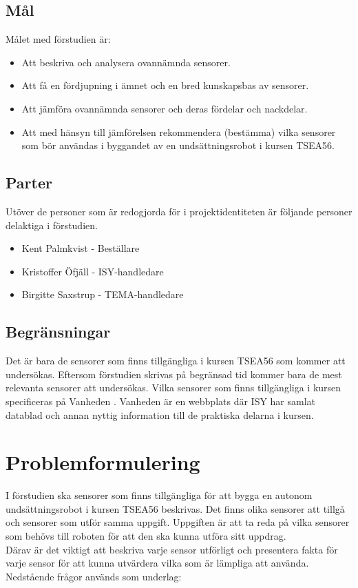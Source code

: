 \documentclass[11pt]{article}
\begin{document}
\begin{flushleft}
\subsection{Mål}
Målet med förstudien är:
\begin{itemize}

\item Att beskriva och analysera ovannämnda sensorer.

\item Att få en fördjupning i ämnet och en bred kunskapsbas av sensorer.

\item Att jämföra ovannämnda sensorer och deras fördelar och nackdelar.

\item Att med hänsyn till jämförelsen rekommendera (bestämma) vilka sensorer som bör användas i byggandet av en undsättningsrobot i kursen TSEA56.

\end{itemize} 


\subsection{Parter}
Utöver de personer som är redogjorda för i projektidentiteten är följande personer delaktiga i förstudien.
\begin{itemize}
\item Kent Palmkvist - Beställare
\item Kristoffer Öfjäll - ISY-handledare
\item Birgitte Saxstrup - TEMA-handledare
\end{itemize}

\subsection{Begränsningar}
Det är bara de sensorer som finns tillgängliga i kursen TSEA56 som kommer att undersökas. Eftersom förstudien skrivas på begränsad tid kommer bara de mest relevanta sensorer att undersökas. Vilka sensorer som finns tillgängliga i kursen specificeras på Vanheden \autocite{vanheden}. Vanheden är en webbplats där ISY har samlat datablad och annan nyttig information till de praktiska delarna i kursen.



\section{Problemformulering}
I förstudien ska sensorer som finns tillgängliga för att bygga en autonom undsättningsrobot i kursen TSEA56 beskrivas. Det finns olika sensorer att tillgå och sensorer som utför samma uppgift. Uppgiften är att ta reda på vilka sensorer som behövs till roboten för att den ska kunna utföra sitt uppdrag.
\\[0.1in]
Därav är det viktigt att beskriva varje sensor utförligt och presentera fakta för varje sensor för att kunna utvärdera vilka som är lämpliga att använda. Nedstående frågor används som underlag: 
\\[0.1in]


\end{flushleft}
\end{document}
